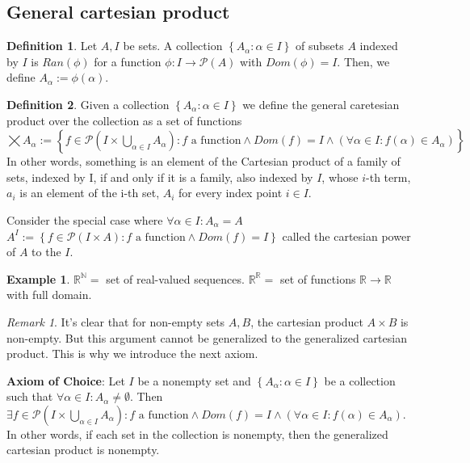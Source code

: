 \documentclass{article}
\newcommand\N{\ensuremath{\mathbb{N}}}
\newcommand\R{\ensuremath{\mathbb{R}}}
\renewcommand\O{\ensuremath{\emptyset}}
\theoremstyle{definition}
\newtheorem{definition}{Definition}[subsection]
\newtheorem{eg}{Example}[subsection]
\theoremstyle{remark}
\newtheorem*{remark}{Remark}
\theoremstyle{plain}
\begin{document}
\subsection{General cartesian product}

\begin{definition}
    Let \(A, I\) be sets. A collection \(\left\{ A_{\alpha}: \alpha \in I \right\}\) of subsets \(A\) indexed by \(I\) is \(Ran(\phi)\)
    for a function \(\phi: I \to \mathcal{P}(A)\) with \(Dom(\phi) = I\). Then, we define \(A_{\alpha} := \phi(\alpha)\).
\end{definition}

\begin{definition}
    Given a collection \(\left\{ A_{\alpha}: \alpha \in I \right\}\) we define 
    the general caretesian product over the collection as a set of functions \\
    \(\bigtimes A_{\alpha} := \left\{ f \in \mathcal{P}(I\times \bigcup\limits_{\alpha \in I}A_{\alpha}): f \text{ a function} \land Dom(f) = I \land (\forall \alpha \in I: f(\alpha) \in A_{\alpha})\right\}\)\\
    In other words, something is an element of the Cartesian product of a family of sets, indexed by I, if and
    only if it is a family, also indexed by \(I\), whose \(i\)-th term, \(a_i\)
    is an element of the i-th set, \(A_i\)
    for every index point \(i\in I\).
\end{definition}

Consider the special case where \(\forall \alpha \in I: A_{\alpha} = A\)\\
\(A^I:= \left\{ f \in \mathcal{P}(I\times A): f \text{ a function} \land Dom(f) = I \right\}\) called the cartesian power of \(A\) to the \(I\).

\begin{eg}
    \(\R^{\N} =\) set of real-valued sequences. 
    \(\R^{\R} =\) set of functions \(\R \to \R\) with full domain. 
\end{eg}

\begin{remark}
    It's clear that for non-empty sets \(A, B\), the cartesian product \(A\times B\) is non-empty. But this argument cannot be generalized to the generalized cartesian product. This is why we introduce the next axiom. 
\end{remark}

\textbf{Axiom of Choice}: Let \(I\) be a nonempty set and \(\left\{ A_{\alpha}: \alpha \in I \right\}\) be a collection such that \(\forall \alpha \in I: A_{\alpha} \neq \O\). 
Then \(\exists f \in \mathcal{P}(I\times \bigcup_{\alpha \in I}A_{\alpha}):f \text{ a function} \land Dom(f) = I \land (\forall \alpha \in I: f(\alpha) \in A_{\alpha})\).
In other words, if each set in the collection is nonempty, then the generalized cartesian product is nonempty. 
\end{document}

